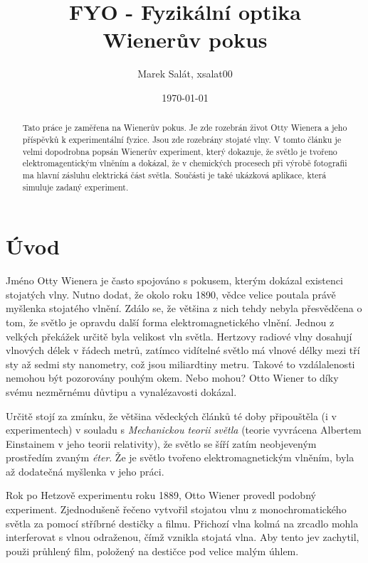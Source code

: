 \documentclass[12pt,a4paper,titlepage,final]{report}
\title{FYO - Fyzikální optika\\Wienerův pokus}
\author{Marek Salát, xsalat00}
\date{\today}
\begin{document}
\lstset{language=Matlab}

\maketitle

\pagestyle{plain}
\setcounter{page}{1}
\tableofcontents

\newpage
\begin{abstract}
Tato práce je zaměřena na Wienerův pokus. Je zde rozebrán život Otty Wienera a jeho příspěvků k experimentální fyzice.
Jsou zde rozebrány stojaté vlny. V tomto článku je velmi dopodrobna popsán Wienerův experiment, který dokazuje, že světlo je
tvořeno elektromagentickým vlněním a dokázal, že v chemických procesech při výrobě fotografii ma hlavní zásluhu
elektrická část světla. Součásti je také ukázková aplikace, která simuluje zadaný experiment.

\end{abstract}

\newpage
\pagestyle{plain}
\setcounter{page}{1}

\section{Úvod}
Jméno Otty Wienera je často spojováno s pokusem, kterým dokázal existenci stojatých vlny. Nutno dodat, že okolo roku 1890, vědce velice poutala právě myšlenka stojatého vlnění. Zdálo se, že většina z nich tehdy nebyla přesvědčena o tom, že světlo je opravdu další 
forma elektromagnetického vlnění. Jednou z velkých překážek určitě byla velikost vln světla. Hertzovy radiové vlny dosahují vlnových délek v řádech metrů, zatímco vidítelné světlo má vlnové délky mezi tří sty až sedmi sty nanometry, což jsou miliardtiny metru. Takové to vzdálalenosti nemohou být pozorovány pouhým okem. Nebo mohou? Otto Wiener to díky svému nezměrnému důvtipu a vynalézavosti dokázal.

Určitě stojí za zmínku, že většina vědeckých článků té doby připouštěla (i v experimentech) v souladu s \emph{Mechanickou teorii světla} (teorie vyvrácena Albertem Einstainem v jeho teorii relativity), že světlo se šíří zatím neobjeveným prostředím zvaným \emph{éter}. Že je světlo
tvořeno elektromagnetickým vlněním, byla až dodatečná myšlenka v jeho práci.
 
Rok po Hetzově experimentu roku 1889, Otto Wiener provedl podobný experiment. Zjednodušeně řečeno vytvořil stojatou vlnu z monochromatického světla za pomocí stříbrné destičky a filmu. Přichozí vlna kolmá na zrcadlo mohla interferovat s vlnou odraženou, čímž vznikla stojatá vlna.
Aby tento jev zachytil, použi průhlený film, položený na destičce pod velice malým úhlem.
\end{document}
